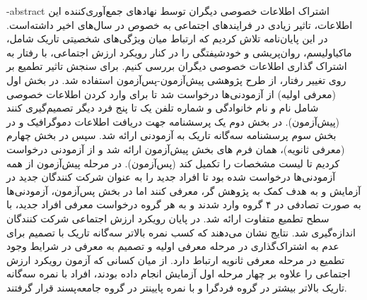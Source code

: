 \fa-abstract{
اشتراک اطلاعات خصوصی دیگران توسط نهادهای جمع‌آوری‌کننده این اطلاعات، تاثیر زیادی در فرایند‌های اجتماعی به خصوص در سال‌های اخیر داشته‌است. در این پایان‌نامه تلاش کردیم که ارتباط میان 
ویژگی‌های شخصیتی تاریک شامل، ماکیاولیسم، روا‌ن‌پریشی و خودشیفتگی را در کنار رویکرد ارزش اجتماعی، با رفتار به اشتراک گذاری اطلاعات خصوصی دیگران بررسی کنیم.
برای سنجش تاثیر تطمیع بر روی تغییر رفتار، از طرح پژوهشی پیش‌آزمون-پس‌آزمون استفاده شد. در بخش اول
\!(معرفی اولیه)
از آزمودنی‌ها درخواست شد تا برای وارد کردن اطلاعات خصوصی شامل نام و نام خانوادگی و شماره تلفن یک تا پنج فرد دیگر تصمیم‌گیری کنند
\!(پیش‌آزمون).
 در بخش دوم یک پرسشنامه جهت دریافت اطلاعات دموگرافیک و در بخش سوم پرسشنامه سه‌گانه تاریک به آزمودنی ارائه شد. سپس در بخش چهارم
\!(معرفی ثانویه)،
همان فرم های بخش پیش‌آزمون ارائه شد و از آزمودنی درخواست کردیم تا لیست مشخصات را تکمیل کند
\!(پس‌آزمون).
در مرحله پیش‌آزمون از همه آزمودنی‌ها درخواست شده بود تا افراد جدید را به عنوان شرکت کنندگان جدید در آزمایش و به هدف کمک به پژوهش گر، معرفی کنند
 اما در بخش پس‌آزمون، آزمودنی‌ها به صورت تصادفی در ۴ گروه وارد شدند و به هر گروه درخواست معرفی افراد جدید، با سطح تطمیع متفاوت ارائه شد.
در پایان رویکرد ارزش اجتماعی شرکت کنندگان اندازه‌گیری شد. نتایج نشان می‌دهند که کسب نمره بالاتر
سه‌گانه تاریک با تصمیم برای عدم به اشتراک‌گذاری در مرحله معرفی اولیه و تصمیم به معرفی در شرایط وجود تطمیع در مرحله معرفی ثانویه ارتباط دارد.
از میان کسانی که آزمون رویکرد ارزش اجتماعی را علاوه بر چهار مرحله اول آزمایش انجام داده بودند، افراد با نمره سه‌گانه تاریک بالاتر بیشتر در گروه 
فردگرا و با نمره پایینتر در گروه جامعه‌پسند قرار گرفتند.
}
\titlePage
\ifoptiondraft{}{%
	\besmPage
	\titlePage
	\davaranPage


	\esalatPage
	\mojavezPage
	\taghdimPage
	\ghadrdaniPage
} %
\abstractPage
\newpage\clearpage
{} %
\tableofcontents \newpage

\pagestyle{fancy}